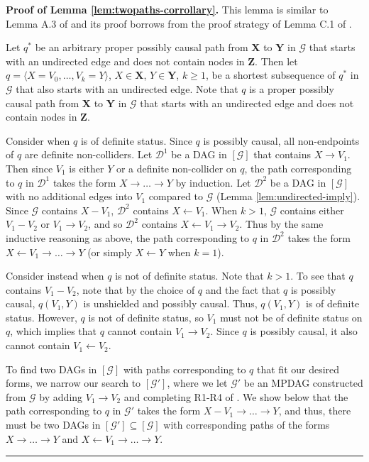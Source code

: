 \documentclass[11pt]{article}
\newcommand{\BlackBox}{\rule{1.5ex}{1.5ex}}  %
\newcommand{\mb}[1]{\mathbf{#1}}
\newcommand{\g}[1][G]{\mathcal{#1}}
\newenvironment{proofof}[1][]{\noindent \textbf{Proof of #1.}}{\hfill\BlackBox}
\begin{document}
\begin{proofof}[Lemma \ref{lem:twopaths-corrollary}]
    This lemma is similar to Lemma A.3 of \cite{perkovic2020identifying} and its proof borrows from the proof strategy of Lemma C.1 of \cite{perkovic2017interpreting}.
    
    Let $q^*$ be an arbitrary proper possibly causal path from $\mb{X}$ to $\mb{Y}$ in $\g$ that starts with an undirected edge and does not contain nodes in $\mb{Z}$. Then let $q=\langle X=V_0, \dots, V_k=Y\rangle$, $X \in \mb{X}$, $Y \in \mb{Y}$, $k \ge 1$, be a shortest subsequence of $q^*$ in $\g$ that also starts with an undirected edge. Note that $q$ is a proper possibly causal path from $\mb{X}$ to $\mb{Y}$ in $\g$ that starts with an undirected edge and does not contain nodes in $\mb{Z}$.

    Consider when $q$ is of definite status. Since $q$ is possibly causal, all non-endpoints of $q$ are definite non-colliders. Let $\g[D]^1$ be a DAG in $[\g]$ that contains $X \to V_1$. Then since $V_1$ is either $Y$ or a definite non-collider on $q$, the path corresponding to $q$ in $\g[D]^1$ takes the form $X \to \dots \to Y$ by induction. Let $\g[D]^2$ be a DAG in $[\g]$ with no additional edges into $V_1$ compared to $\g$ (Lemma \ref{lem:undirected-imply}). Since $\g$ contains $X - V_1$, $\g[D]^2$ contains $X \gets V_1$. When $k>1$, $\g$ contains either $V_1 - V_2$ or $V_1 \to V_2$, and so $\g[D]^2$ contains $X \gets V_1 \to V_2$. Thus by the same inductive reasoning as above, the path corresponding to $q$ in $\g[D]^2$ takes the form $X \gets V_1 \to \dots \to Y$ (or simply $X \gets Y$ when $k=1$).
    
    Consider instead when $q$ is not of definite status. Note that $k>1$. To see that $q$ contains $V_1 - V_2$, note that by the choice of $q$ and the fact that $q$ is possibly causal, $q(V_1,Y)$ is unshielded and possibly causal. Thus, $q(V_1,Y)$ is of definite status. However, $q$ is not of definite status, so $V_1$ must not be of definite status on $q$, which implies that $q$ cannot contain $V_1 \to V_2$. Since $q$ is possibly causal, it also cannot contain $V_1 \gets V_2$.

    To find two DAGs in $[\g]$ with paths corresponding to $q$ that fit our desired forms, we narrow our search to $[\g']$, where we let $\g'$ be an MPDAG constructed from $\g$ by adding $V_1 \to V_2$ and completing R1-R4 of \cite{meek1995causal}. We show below that the path corresponding to $q$ in $\g'$ takes the form $X - V_1 \to \dots \to Y$, and thus, there must be two DAGs in $[\g'] \subseteq [\g]$ with corresponding paths of the forms $X \to \dots \to Y$ and $X \gets V_1 \to \dots \to Y$.
            

\end{proofof}
\end{document}
